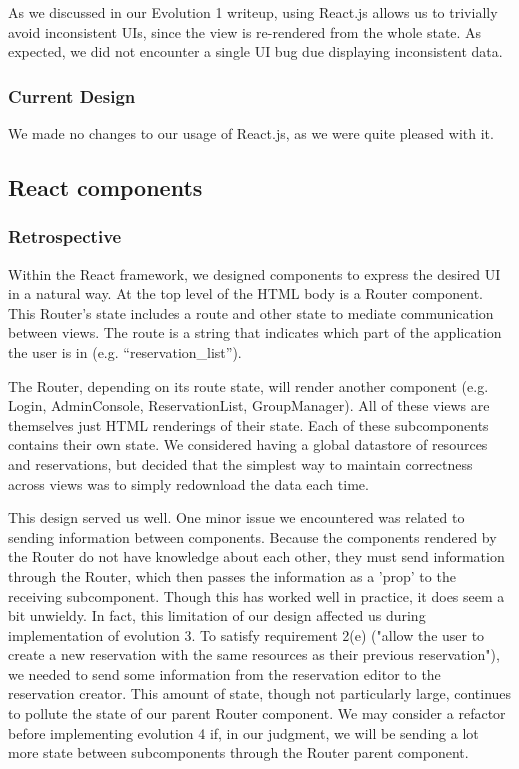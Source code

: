 \documentclass[12pt]{article}
\begin{document}
As we discussed in our Evolution 1 writeup, using React.js allows us to trivially avoid inconsistent UIs, since the view is re-rendered from the whole state. As expected, we did not encounter a single UI bug due displaying inconsistent data.

\subsubsection{Current Design}
We made no changes to our usage of React.js, as we were quite pleased with it.

\subsection{React components}
\subsubsection{Retrospective}
Within the React framework, we designed components to express the desired UI in a natural way. At the top level of the HTML body is a Router component. This Router's state includes a route and other state to mediate communication between views. The route is a string that indicates which part of the application the user is in (e.g. ``reservation\_list'').

The Router, depending on its route state, will render another component (e.g. Login, AdminConsole, ReservationList, GroupManager). All of these views are themselves just HTML renderings of their state. Each of these subcomponents contains their own state. We considered having a global datastore of resources and reservations, but decided that the simplest way to maintain correctness across views was to simply redownload the data each time.

This design served us well. One minor issue we encountered was related to sending information between components. Because the components rendered by the Router do not have knowledge about each other, they must send information through the Router, which then passes the information as a 'prop' to the receiving subcomponent. Though this has worked well in practice, it does seem a bit unwieldy. In fact, this limitation of our design affected us during implementation of evolution 3. To satisfy requirement 2(e) ("allow the user to create a new reservation with the same resources as their previous reservation"), we needed to send some information from the reservation editor to the reservation creator. This amount of state, though not particularly large, continues to pollute the state of our parent Router component. We may consider a refactor before implementing evolution 4 if, in our judgment, we will be sending a lot more state between subcomponents through the Router parent component.
\end{document}
